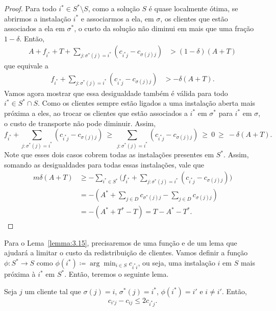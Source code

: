 \begin{proof} 
    Para todo $i^* \in S^* \setminus S$, como a solução $S$ é quase localmente ótima, se abrirmos a instalação $i^*$ e associarmos a ela, em $\sigma$, os clientes que estão associados a ela em $\sigma^*$, o custo da solução não diminui em mais que uma fração $1-\delta$. Então,
    \begin{align*} 
      A + f_{i^*} + T + \sum_{j : \sigma^*(j) = i^*} (c_{i^*j} - c_{\sigma(j)j}) &> (1-\delta)(A+T)
    \end{align*} 
que equivale a 
    \begin{align*} 
    f_{i^*} + \sum_{j : \sigma^*(j) = i^*} (c_{i^*j} - c_{\sigma(j)j}) &> -\delta(A+T).
    \end{align*} 
    Vamos agora mostrar que essa desigualdade também é válida para todo $i^* \in S^* \cap S$. Como os clientes sempre estão ligados a uma instalação aberta mais próxima a eles, ao trocar os clientes que estão associados a $i^*$ em $\sigma^*$ para $i^*$ em $\sigma$, o custo de transporte não pode diminuir. Assim, 
    \[ f_{i^*} + \sum_{j : \sigma^*(j) = i^*} (c_{i^*j} - c_{\sigma(j)j}) 
           \ \geq \ \sum_{j : \sigma^*(j) = i^*} (c_{i^*j} - c_{\sigma(j)j})
           \ \geq \ 0 \ \geq \ -\delta(A+T).  \]
    Note que esses dois casos cobrem todas as instalações presentes em $S^*$. Assim, somando as desigualdades para todas essas instalações, vale que
    \begin{subequations}\begin{align*} 
        m\delta(A+T) &\geq  - \sum_{i^* \in S^*}\Big( f_{i^*} + \sum_{j : \sigma^*(j) = i^*} (c_{i^*j} - c_{\sigma(j)j})\Big) \\
        & = -(A^* + \sum_{j \in D} c_{\sigma^*(j)j} - \sum_{j \in D}c_{\sigma(j)j}) \\
        & = - (A^* + T^* - T) = T - A^* - T^*.
    \end{align*}
    \end{subequations}
\end{proof}

Para o Lema~\ref{lemma:3.15}, precisaremos de uma função e de um lema que ajudará a limitar o custo da redistribuição de clientes. 
Vamos definir a função $\phi : S^* \rightarrow S$ como ${\phi(i^*) \coloneqq \arg\min_{i \in S} c_{i^*i}}$, ou seja, uma instalação $i$ em $S$ mais próxima à $i^*$ em $S^*$. Então, teremos o seguinte lema.

\begin{lemma}
    \label{lemma:3.14}
    Seja $j$ um cliente tal que $\sigma(j) = i$, $\sigma^*(j) = i^*$, $\phi(i^*) = i'$ e $i\neq i'.$ Então, \[c_{i'j} - c_{ij} \leq 2c_{i^*j}.\]
\end{lemma}

